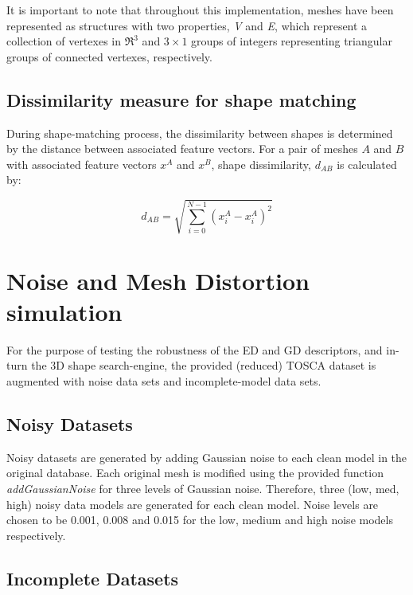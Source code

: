 \documentclass[12pt]{article}
\begin{document}
	\noindent
	It is important to note that throughout this implementation, meshes have been represented as structures with two properties, \emph{V} and \emph{E}, which represent a collection of vertexes in $\Re^3$ and $3\times1$ groups of integers representing triangular groups of connected vertexes, respectively.


	\subsection*{Dissimilarity measure for shape matching}

		\noindent
		During shape-matching process, the dissimilarity between shapes is determined by the distance between associated feature vectors. For a pair of meshes $A$ and $B$ with associated feature vectors $x^{A}$ and $x^{B}$, shape dissimilarity, $d_{AB}$ is calculated by:

		\begin{equation}
			d_{AB} = \sqrt{\sum_{i=0}^{N-1}\left( x^{A}_{i} - x^{A}_{i} \right)^{2}}
			\label{eq::shape_distance}
		\end{equation} 



\section*{Noise and Mesh Distortion simulation}
	
	\noindent
	For the purpose of testing the robustness of the ED and GD descriptors, and in-turn the 3D shape search-engine, the provided (reduced) TOSCA dataset is augmented with noise data sets and incomplete-model data sets.

	\subsection*{Noisy Datasets}

		\noindent
		Noisy datasets are generated by adding Gaussian noise to each clean model in the original database. Each original mesh is modified using the provided function \emph{addGaussianNoise} for three levels of Gaussian noise. Therefore, three (low, med, high) noisy data models are generated for each clean model. Noise levels are chosen to be 0.001, 0.008 and 0.015 for the low, medium and high noise models respectively.


	\subsection*{Incomplete Datasets}
\end{document}
